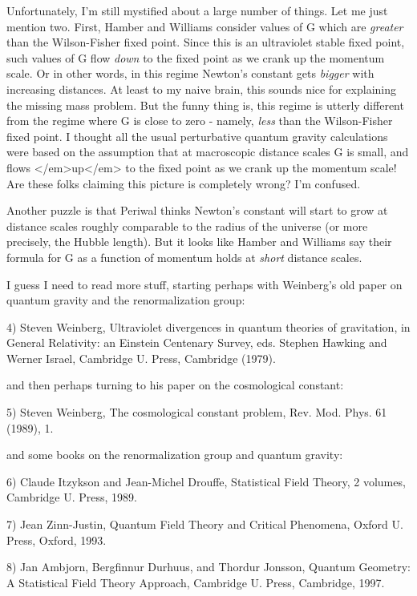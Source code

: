 Unfortunately, I'm still mystified about a large number of things.  
Let me just mention two.  First, Hamber and Williams consider values
of G which are \emph{greater} than the Wilson-Fisher fixed point.  Since
this is an ultraviolet stable fixed point, such values of G flow \emph{down}
to the fixed point as we crank up the momentum scale.  Or in other 
words, in this regime Newton's constant gets \emph{bigger} with increasing
distances.  At least to my naive brain, this sounds nice for explaining
the missing mass problem.  But the funny thing is, this regime is 
utterly different from the regime where G is close to zero - namely,
\emph{less} than the Wilson-Fisher fixed point.  I thought all the usual
perturbative quantum gravity calculations were based on the assumption
that at macroscopic distance scales G is small, and flows </em>up</em> to 
the fixed point as we crank up the momentum scale!  Are these folks 
claiming this picture is completely wrong?  I'm confused.  

Another puzzle is that Periwal thinks Newton's constant will start
to grow at distance scales roughly comparable to the radius of the
universe (or more precisely, the Hubble length).  But it looks like
Hamber and Williams say their formula for G as a function of momentum
holds at \emph{short} distance scales.  

I guess I need to read more stuff, starting perhaps with Weinberg's 
old paper on quantum gravity and the renormalization group:

4) Steven Weinberg, Ultraviolet divergences in quantum theories of
gravitation, in General Relativity: an Einstein Centenary Survey, 
eds. Stephen Hawking and Werner Israel, Cambridge U. Press, Cambridge
(1979).

and then perhaps turning to his paper on the cosmological constant:

5) Steven Weinberg, The cosmological constant problem, Rev. Mod. Phys.
61 (1989), 1.  

and some books on the renormalization group and quantum gravity:

6) Claude Itzykson and Jean-Michel Drouffe, Statistical Field Theory,
2 volumes, Cambridge U. Press, 1989.

7) Jean Zinn-Justin, Quantum Field Theory and Critical Phenomena,
Oxford U. Press, Oxford, 1993.

8) Jan Ambjorn, Bergfinnur Durhuus, and Thordur Jonsson, Quantum 
Geometry: A Statistical Field Theory Approach, Cambridge U. Press, 
Cambridge, 1997.


